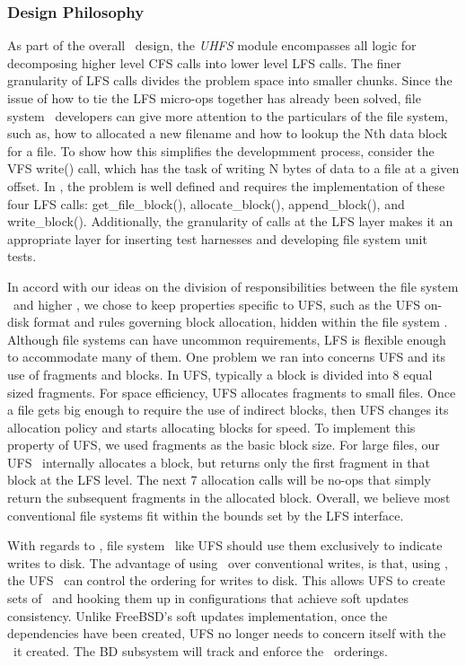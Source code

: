 \subsubsection {Design Philosophy}
As part of the overall \Kudos\ design, the \emph{UHFS} module encompasses all
logic for decomposing higher level CFS calls into lower level LFS calls. The
finer granularity of LFS calls divides the problem space into smaller chunks.
Since the issue of how to tie the LFS micro-ops together has already been
solved, file system \module\ developers can give more attention to the
particulars of the file system, such as, how to allocated a new filename and
how to lookup the Nth data block for a file. To show how this simplifies the
developmment process, consider the VFS write() call, which has the task of
writing N bytes of data to a file at a given offset. In \Kudos, the problem is
well defined and requires the implementation of these four LFS calls:
get\_file\_block(), allocate\_block(), append\_block(), and write\_block().
Additionally, the granularity of calls at the LFS layer makes it an appropriate
layer for inserting test harnesses and developing file system unit tests.

In accord with our ideas on the division of responsibilities between the file
system \module\ and higher \modules, we chose to keep properties specific to
UFS, such as the UFS on-disk format and rules governing block allocation,
hidden within the file system \module. Although file systems can have uncommon
requirements, LFS is flexible enough to accommodate many of them. One problem
we ran into concerns UFS and its use of fragments and blocks. In UFS, typically
a block is divided into 8 equal sized fragments. For space efficiency, UFS
allocates fragments to small files. Once a file gets big enough to require the
use of indirect blocks, then UFS changes its allocation policy and starts
allocating blocks for speed. To implement this property of UFS, we used
fragments as the basic block size. For large files, our UFS
\module\ internally allocates a block, but returns only the first fragment in
that block at the LFS level. The next 7 allocation calls will be no-ops that
simply return the subsequent fragments in the allocated block. Overall, we
believe most conventional file systems fit within the bounds set by the LFS
interface.

With regards to \chdescs, file system \modules\ like UFS should use them
exclusively to indicate writes to disk. The advantage of using \chdescs\ over
conventional writes, is that, using \chdescs, the UFS \module\ can control the
ordering for writes to disk. This allows UFS to create sets of \chdescs\ and
hooking them up in configurations that achieve soft updates consistency. Unlike
FreeBSD's soft updates implementation, once the dependencies have been created,
UFS no longer needs to concern itself with the \chdescs\ it created. The BD
subsystem will track and enforce the \chdesc\ orderings.

